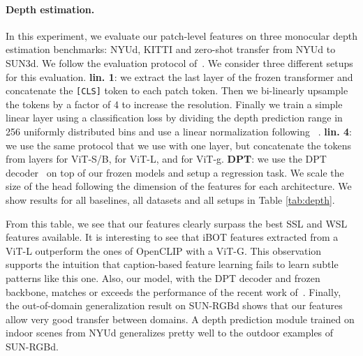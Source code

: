 \paragraph{Depth estimation.}
In this experiment, we evaluate our patch-level features on three monocular depth estimation benchmarks: NYUd, KITTI and zero-shot transfer from NYUd to SUN3d.
We follow the evaluation protocol of~\citet{li2022binsformer}.
We consider three different setups for this evaluation.
\textbf{lin. 1}: we extract the last layer of the frozen transformer and concatenate the \texttt{[CLS]} token to each patch token. 
Then we bi-linearly upsample the tokens by a factor of 4 to increase the resolution. 
Finally we train a simple linear layer using a classification loss by dividing the depth prediction range in 256 uniformly distributed bins and use a linear normalization following ~\cite{bhat2019adabins}.
\textbf{lin. 4}: we use the same protocol that we use with one layer, but concatenate the tokens from layers  for ViT-S/B,  for ViT-L, and  for ViT-g.
\textbf{DPT}: we use the DPT decoder~\citep{ranftl2021vision} on top of our frozen models and setup a regression task. 
We scale the size of the head following the dimension of the features for each architecture. 
We show results for all baselines, all datasets and all setups in Table \ref{tab:depth}.

From this table, we see that our features clearly surpass the best SSL and WSL features available.
It is interesting to see that iBOT features extracted from a ViT-L outperform the ones of OpenCLIP with a ViT-G.
This observation supports the intuition that caption-based feature learning fails to learn subtle patterns like this one.
Also, our model, with the DPT decoder and frozen backbone, matches or exceeds the performance of the recent work of~\citet{li2022binsformer}.
Finally, the out-of-domain generalization result on SUN-RGBd shows that our features allow very good transfer between domains. 
A depth prediction module trained on indoor scenes from NYUd generalizes pretty well to the outdoor examples of SUN-RGBd.

